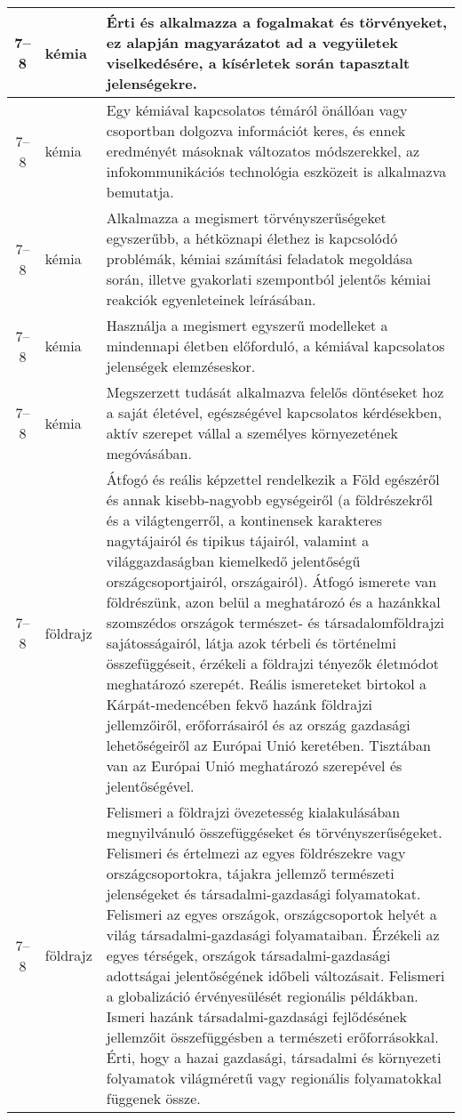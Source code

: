 \begin{small}
\begin{longtable}{c | p{2cm} |  p{11cm} }
              7--8 & kémia & Érti és alkalmazza a fogalmakat és törvényeket, ez alapján magyarázatot ad a vegyületek viselkedésére, a kísérletek során tapasztalt jelenségekre. \\ \hline
              7--8 & kémia & Egy kémiával kapcsolatos témáról önállóan vagy csoportban dolgozva információt keres, és ennek eredményét másoknak változatos módszerekkel, az infokommunikációs technológia eszközeit is alkalmazva bemutatja. \\ \hline
              7--8 & kémia & Alkalmazza a megismert törvényszerűségeket egyszerűbb, a hétköznapi élethez is kapcsolódó problémák, kémiai számítási feladatok megoldása során, illetve gyakorlati szempontból jelentős kémiai reakciók egyenleteinek leírásában. \\ \hline
              7--8 & kémia & Használja a megismert egyszerű modelleket a mindennapi életben előforduló, a kémiával kapcsolatos jelenségek elemzéseskor. \\ \hline
              7--8 & kémia & Megszerzett tudását alkalmazva felelős döntéseket hoz a saját életével, egészségével kapcsolatos kérdésekben, aktív szerepet vállal a személyes környezetének megóvásában. \\ \hline
              7--8 & földrajz & Átfogó és reális képzettel rendelkezik a Föld egészéről és annak kisebb-nagyobb egységeiről (a földrészekről és a világtengerről, a kontinensek karakteres nagytájairól és tipikus tájairól, valamint a világgazdaságban kiemelkedő jelentőségű országcsoportjairól, országairól). Átfogó ismerete van földrészünk, azon belül a meghatározó és a hazánkkal szomszédos országok természet- és társadalomföldrajzi sajátosságairól, látja azok térbeli és történelmi összefüggéseit, érzékeli a földrajzi tényezők életmódot meghatározó szerepét. Reális ismereteket birtokol a Kárpát-medencében fekvő hazánk földrajzi jellemzőiről, erőforrásairól és az ország gazdasági lehetőségeiről az Európai Unió keretében. Tisztában van az Európai Unió meghatározó szerepével és jelentőségével. \\ \hline
              7--8 & földrajz & Felismeri a földrajzi övezetesség kialakulásában megnyilvánuló összefüggéseket és törvényszerűségeket. Felismeri és értelmezi az egyes földrészekre vagy országcsoportokra, tájakra jellemző természeti jelenségeket és  társadalmi-gazdasági folyamatokat. Felismeri az egyes országok, országcsoportok helyét a világ társadalmi-gazdasági folyamataiban. Érzékeli az egyes térségek, országok társadalmi-gazdasági adottságai jelentőségének időbeli változásait. Felismeri a globalizáció érvényesülését regionális példákban. Ismeri hazánk társadalmi-gazdasági fejlődésének jellemzőit összefüggésben a természeti erőforrásokkal. Érti, hogy a hazai gazdasági, társadalmi és környezeti folyamatok világméretű vagy regionális folyamatokkal függenek össze. \\ \hline

\end{longtable}
\end{small}
